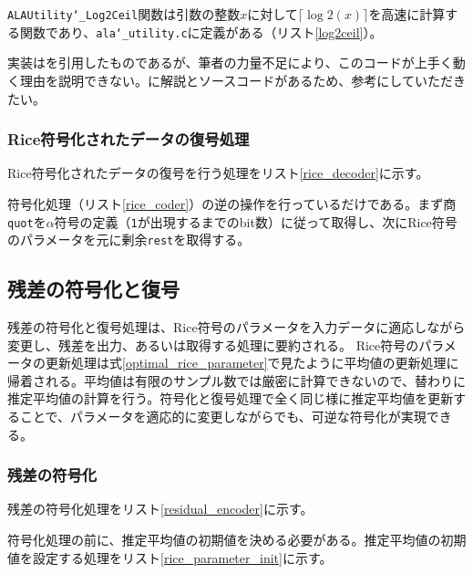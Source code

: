 \documentclass[uplatex,dvipdfmx,b5j,10pt]{jsbook}
\theoremstyle{definition}
\begin{document}
\texttt{ALAUtility\char`_Log2Ceil}関数は引数の整数$x$に対して$\lceil \log 2(x) \rceil$を高速に計算する関数であり、\texttt{ala\char`_utility.c}に定義がある（リスト\ref{log2ceil}）。

実装は\cite{nlz10}を引用したものであるが、筆者の力量不足により、このコードが上手く動く理由を説明できない。\cite{hackersdelight, bitcountfind}に解説とソースコードがあるため、参考にしていただきたい。

\subsubsection{Rice符号化されたデータの復号処理}

Rice符号化されたデータの復号を行う処理をリスト\ref{rice_decoder}に示す。


符号化処理（リスト\ref{rice_coder}）の逆の操作を行っているだけである。まず商\texttt{quot}を$\alpha$符号の定義（\texttt{1}が出現するまでのbit数）に従って取得し、次にRice符号のパラメータを元に剰余\texttt{rest}を取得する。

\subsection{残差の符号化と復号}

残差の符号化と復号処理は、Rice符号のパラメータを入力データに適応しながら変更し、残差を出力、あるいは取得する処理に要約される。
Rice符号のパラメータの更新処理は式\ref{optimal_rice_parameter}で見たように平均値の更新処理に帰着される。平均値は有限のサンプル数では厳密に計算できないので、替わりに推定平均値の計算を行う。符号化と復号処理で全く同じ様に推定平均値を更新することで、パラメータを適応的に変更しながらでも、可逆な符号化が実現できる。

\subsubsection{残差の符号化}

残差の符号化処理をリスト\ref{residual_encoder}に示す。


符号化処理の前に、推定平均値の初期値を決める必要がある。推定平均値の初期値を設定する処理をリスト\ref{rice_parameter_init}に示す。

\end{document}
